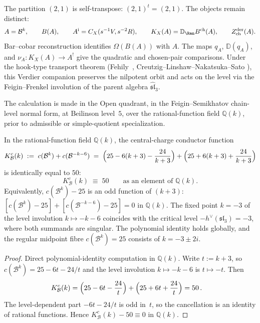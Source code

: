 The partition $(2,1)$ is self-transpose: $(2,1)^t = (2,1)$. The
objects remain distinct:
\[
A=\mathcal{B}^k,\qquad B(A),\qquad
A^{\mathrm i}=C_X(s^{-1}V,s^{-2}R),\qquad
K_X(A)=\mathbb D_{\Ran}B^{\mathrm{ch}}(A),\qquad
Z^{\mathrm{der}}_{\mathrm{ch}}(A).
\]
Bar--cobar reconstruction identifies $\Omega(B(A))$ with $A$.
The maps $q_A$, $\mathbb D(q_A)$, and
$\nu_A\colon K_X(A)\to A^!$ give the quadratic and chosen-pair
comparisons. Under the hook-type transport theorem
(Fehily~\cite{FehilyHook}, Creutzig--Linshaw--Nakatsuka--Sato
\cite{CLNS24}), this Verdier companion preserves the nilpotent orbit
and acts on the level via the Feigin--Frenkel involution of the parent
algebra $\widehat{\mathfrak{sl}}_3$.

\begin{theorem}
\label{thm:bp-koszul-conductor-polynomial}
The calculation is made in the Open quadrant, in the
Feigin--Semikhatov chain-level normal form, at Beilinson level~$5$,
over the rational-function field $\mathbb{Q}(k)$, prior to admissible
or simple-quotient specialization.

In the rational-function field $\mathbb{Q}(k)$, the central-charge conductor
function
\[
K^c_{\mathcal{B}}(k)
\;:=\;
c(\mathcal{B}^k) + c(\mathcal{B}^{-k-6})
\;=\;
\Bigl(25 - 6(k+3) - \frac{24}{k+3}\Bigr)
 + \Bigl(25 + 6(k+3) + \frac{24}{k+3}\Bigr)
\]
is identically equal to $50$:
\[
K^c_{\mathcal{B}}(k) \;\equiv\; 50 \qquad \text{as an element of }
\mathbb{Q}(k).
\]
Equivalently, $c(\mathcal{B}^k) - 25$ is an odd function of $(k+3)$:
$[c(\mathcal{B}^k) - 25] + [c(\mathcal{B}^{-k-6}) - 25] = 0$ in
$\mathbb{Q}(k)$. The fixed point $k = -3$ of the level involution
$k \mapsto -k-6$ coincides with the critical level
$-h^\vee(\mathfrak{sl}_3) = -3$, where both summands are singular.
The polynomial identity holds globally, and the regular midpoint fibre
$c(\mathcal{B}^k)=25$ consists of $k=-3\pm2i$.
\end{theorem}

\begin{proof}
Direct polynomial-identity computation in $\mathbb{Q}(k)$. Write
$t := k+3$, so $c(\mathcal{B}^k) = 25 - 6t - 24/t$ and the level
involution $k \mapsto -k-6$ is $t \mapsto -t$. Then
\begin{align*}
K^c_{\mathcal{B}}(k)
&= \Bigl(25 - 6t - \frac{24}{t}\Bigr)
 + \Bigl(25 + 6t + \frac{24}{t}\Bigr)
 = 50\,.
\end{align*}
The level-dependent part $-6t - 24/t$ is odd in~$t$, so the
cancellation is an identity of rational functions. Hence $K^c_{\mathcal{B}}(k) - 50
\equiv 0$ in $\mathbb{Q}(k)$.
\end{proof}

